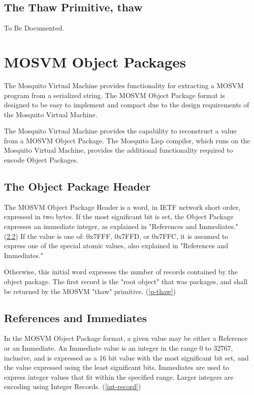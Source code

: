 \documentclass[notitlepage,oneside]{book}
\begin{document}
\section{The Thaw Primitive, thaw}
\label{p-thaw}

To Be Documented.

\chapter{MOSVM Object Packages}
\label{serialization}

The Mosquito Virtual Machine provides functionality for extracting a MOSVM program from a serialized string.  The MOSVM Object Package format is designed to be easy to implement and compact due to the design requirements of the Mosquito Virtual Machine.

The Mosquito Virtual Machine provides the capability to reconstruct a value from a MOSVM Object Package.  The Mosquito Lisp compiler, which runs on the Mosquito Virtual Machine, provides the additional functionality required to encode Object Packages.

\section{The Object Package Header}
\label{package-header}

The MOSVM Object Package Header is a word, in IETF network short order, expressed in two bytes.  If the most significant bit is set, the Object Package 
expresses an immediate integer, as explained in "References and Immediates." (\ref{refs})  If the value is one of: 0x7FFF, 0x7FFD, or 0x7FFC, it is assumed to express one of the special atomic values, also explained in "References and Immediates."

Otherwise, this initial word expresses the number of records contained by the object package.  The first record is the "root object" that was packages, and shall be returned by the MOSVM "thaw" primitive. (\ref{p-thaw})

\section{References and Immediates}
\label{refs}

In the MOSVM Object Package format, a given value may be either a Reference or an Immediate.  An Immediate value is an integer in the range 0 to 32767, inclusive, and is expressed as a 16 bit value with the most significant bit set, and the value expressed using the least significant bits.  Immediates are used to express integer values that fit within the specified range.  Larger integers are encoding using Integer Records. (\ref{int-record})
\end{document}
